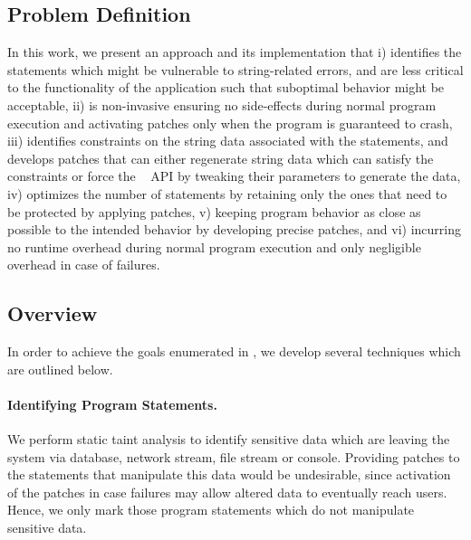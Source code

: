 \subsection{Problem Definition}
\label{subsec:problem}

In this work, we present an approach and its implementation that i) identifies
the statements which might be vulnerable to string-related errors,
and are less critical to the functionality of the application such that
suboptimal behavior might be acceptable, ii) is non-invasive ensuring no
side-effects during normal program execution and activating patches only when
the program is guaranteed to crash, iii) identifies constraints on the string
data associated with the statements, and develops patches that can either
regenerate string data which can satisfy the constraints
or force the \java\  API by tweaking their parameters to generate
the data, iv) optimizes the
number of statements by retaining only the ones that need to be protected by
applying patches,  v) keeping program behavior as close as possible to the
intended behavior by developing precise patches, and vi) incurring no runtime
overhead during normal program execution and only negligible overhead in case of
failures.

\subsection{Overview}
\label{subsec:overview}

In order to achieve the goals enumerated in , we
develop
several techniques which are outlined below.

\paragraph{Identifying Program Statements.} We perform static taint analysis
to identify sensitive data which are leaving the system via database, network
stream, file stream or console. Providing patches to the
statements that manipulate this data would be undesirable, since
activation of the patches in case failures may allow altered data to eventually
reach
users. Hence, we only mark those program statements which do not manipulate
sensitive data.


